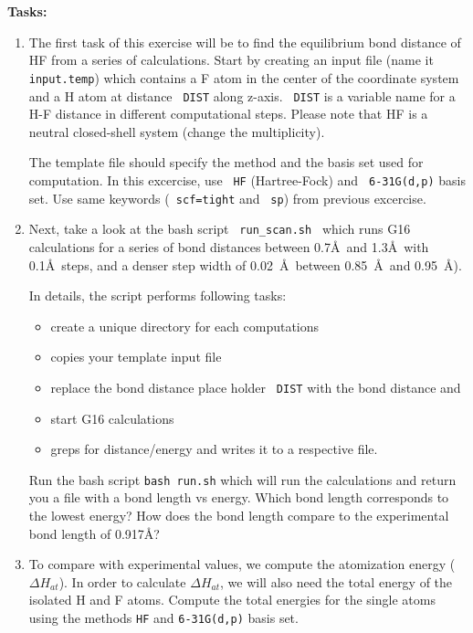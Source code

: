 \textbf{Tasks:}
\begin{enumerate} 

\item The first task of this exercise will be to find the equilibrium bond distance of HF from a series
of calculations. Start by creating an input file (name it \texttt{ input.temp}) which contains a F atom in the center of the coordinate system and a H atom at distance \texttt{ DIST} along z-axis. \texttt{ DIST} is a variable name for a H-F distance in different computational steps. Please note that HF is a neutral closed-shell system (change the multiplicity). 

The template file should specify the method and the basis set used for computation. In this excercise, use \texttt{ HF} (Hartree-Fock) and \texttt{ 6-31G(d,p)} basis set. Use same keywords (\texttt{ scf=tight} and \texttt{ sp}) from previous excercise. 
%
\item Next, take a look at the bash script \texttt{ run\_scan.sh } which runs G16 calculations for a series of bond distances 
between 0.7\AA\ and 1.3\AA\ with 0.1\AA\ steps, and a denser step width of 0.02~\AA\ between 0.85~\AA\ and 0.95~\AA).\\ 

\begin{tip}
In details, the script performs following tasks:
   \begin{itemize}
   \item create a unique directory for each computations
   \item copies your template input file
   \item replace the bond distance place holder \texttt{ DIST} with the bond distance and
   \item start G16 calculations
   \item greps for distance/energy and writes it to a respective file. 
   \end{itemize}
\end{tip}

Run the bash script \texttt{bash run.sh} which will run the calculations and return you a file with a bond length vs energy. 
Which bond length corresponds to the lowest energy? How does the bond length compare to the experimental bond length of 0.917\AA?

\item To compare with experimental values, we compute the atomization energy ($\Delta H_{at}$).
In order to calculate $\Delta H_{at}$, we will also need the total energy of the isolated H and F atoms. Compute the total energies for the single atoms using the methods \texttt{HF} and \texttt{6-31G(d,p)} basis set. 


\end{enumerate}

